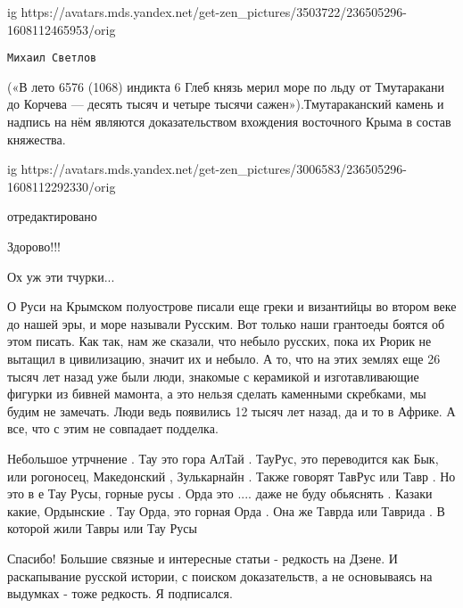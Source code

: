 \begin{itemize}

\ifcmt
  ig https://avatars.mds.yandex.net/get-zen_pictures/3503722/236505296-1608112465953/orig
\fi

\verb|Михаил Светлов|

(«В лето 6576 (1068) индикта 6 Глеб князь мерил море по льду от Тмутаракани до
Корчева — десять тысяч и четыре тысячи сажен»).Тмутараканский камень и надпись
на нём являются доказательством вхождения восточного Крыма в состав княжества.

\ifcmt
  ig https://avatars.mds.yandex.net/get-zen_pictures/3006583/236505296-1608112292330/orig
\fi

отредактировано

Здорово!!!

Ох уж эти тчурки...


О Руси на Крымском полуострове писали еще греки и византийцы во втором веке до
нашей эры, и море называли Русским. Вот только наши грантоеды боятся об этом
писать. Как так, нам же сказали, что небыло русских, пока их Рюрик не вытащил в
цивилизацию, значит их и небыло. А то, что на этих землях еще 26 тысяч лет
назад уже были люди, знакомые с керамикой и изготавливающие фигурки из бивней
мамонта, а это нельзя сделать каменными скребками, мы будим не замечать. Люди
ведь появились 12 тысяч лет назад, да и то в Африке. А все, что с этим не
совпадает подделка.


Небольшое утрчнение
.
Тау это гора АлТай
.
ТауРус, это переводится как Бык, или рогоносец, Македонский , Зулькарнайн
.
Также говорят ТавРус или Тавр
.
Но это в е Тау Русы, горные русы
.
Орда это .... даже не буду обьяснять
.
Казаки какие, Ордынские
.
Тау Орда, это горная Орда
.
Она же Таврда или Таврида
.
В которой жили Тавры или Тау Русы


Спасибо! Большие связные и интересные статьи - редкость на Дзене. И
раскапывание русской истории, с поиском доказательств, а не основываясь на
выдумках - тоже редкость. Я подписался.
\end{itemize}
